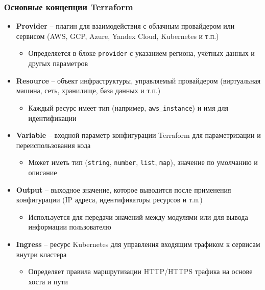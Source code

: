\documentclass{beamer}
\begin{document}
\begin{frame}
\frametitle{Основные концепции Terraform}

\begin{itemize}
  \item \textbf{Provider} – плагин для взаимодействия с облачным провайдером или сервисом (AWS, GCP, Azure, Yandex Cloud, Kubernetes и т.п.)
  \begin{itemize}
    \item Определяется в блоке \texttt{provider} с указанием региона, учётных данных и другых параметров
  \end{itemize}
  
  \item \textbf{Resource} – объект инфраструктуры, управляемый провайдером (виртуальная машина, сеть, хранилище, база данных и т.п.)
  \begin{itemize}
    \item Каждый ресурс имеет тип (например, \texttt{aws\_instance}) и имя для идентификации
  \end{itemize}
  
  \item \textbf{Variable} – входной параметр конфигурации Terraform для параметризации и переиспользования кода
  \begin{itemize}
    \item Может иметь тип (\texttt{string}, \texttt{number}, \texttt{list}, \texttt{map}), значение по умолчанию и описание
  \end{itemize}
  
  \item \textbf{Output} – выходное значение, которое выводится после применения конфигурации (IP адреса, идентификаторы ресурсов и т.п.)
  \begin{itemize}
    \item Используется для передачи значений между модулями или для вывода информации пользователю
  \end{itemize}
  
  \item \textbf{Ingress} – ресурс Kubernetes для управления входящим трафиком к сервисам внутри кластера
  \begin{itemize}
    \item Определяет правила маршрутизации HTTP/HTTPS трафика на основе хоста и пути
  \end{itemize}
\end{itemize}

\end{frame}
\end{document}
